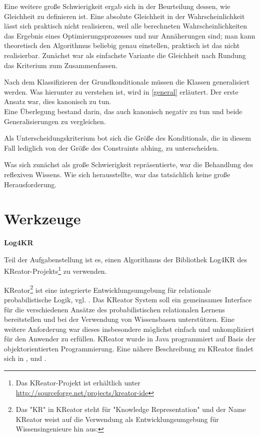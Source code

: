 \documentclass[a4paper, 11pt]{book}
\begin{document}
Eine weitere große Schwierigkeit ergab sich in der Beurteilung dessen, wie Gleichheit zu definieren ist. Eine absolute Gleichheit in der Wahrscheinlichkeit lässt sich praktisch nicht realisieren, weil alle berechneten Wahrscheinlichkeiten das Ergebnis eines Optimierungsprozesses und nur Annäherungen sind; man kann theoretisch den Algorithmus beliebig genau einstellen, praktisch ist das nicht realisierbar. Zunächst war als einfachste Variante die Gleichheit nach Rundung das Kriterium zum Zusammenfassen.

Nach dem Klassifizieren der Grundkonditionale müssen die Klassen generalisiert werden. Was hierunter zu verstehen ist, wird in \ref{general} erläutert. 
Der erste Ansatz war, dies kanonisch zu tun.\\
Eine Überlegung bestand darin, das auch kanonisch negativ zu tun und beide Generalisierungen zu vergleichen.

Als Unterscheidungskriterium bot sich die Größe des Konditionals, die in diesem Fall lediglich von der Größe des Constraints abhing, zu unterscheiden.

Was sich zunächst als große Schwierigkeit repräsentierte, war die Behandlung des reflexiven Wissens. Wie sich herausstellte, war das tatsächlich keine große Herausforderung. 





\section{Werkzeuge}

\textbf{Log4KR}

Teil der Aufgabenstellung ist es, einen Algorithmus der Bibliothek Log4KR des KReator-Projekts\footnote{Das KReator-Projekt ist erhältlich unter \href{http://sourceforge.net/projects/kreator-ide}{http://sourceforge.net/projects/kreator-ide}} zu verwenden.

KReator\footnote{Das "{}KR"{} in KReator steht für "{}Knowledge Representation"{} und der Name KReator weist auf die Verwendung als Entwicklungsumgebung für Wissensingenieure hin aus:\cite{FLT09}} ist eine integrierte Entwicklungsumgebung für relationale probabilistische Logik, vgl. \cite{BHM14}. Das KReator System soll ein gemeinsames Interface für die verschiedenen Ansätze des probabilistischen relationalen Lernens bereitstellen und bei der Verwendung von Wissensbasen unterstützen. Eine weitere Anforderung war dieses insbesondere möglichst einfach und unkompliziert für den Anwender zu erfüllen. KReator wurde in Java programmiert auf Basis der objektorientierten Programmierung. Eine nähere Beschreibung zu KReator findet sich in \cite{TFLKIB10}, \cite{KIBFT11} und \cite{FLT09}.
\end{document}
